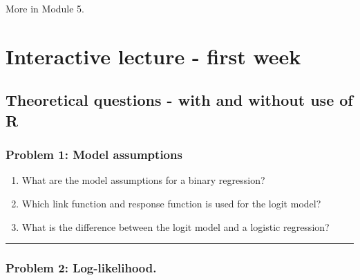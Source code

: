 \documentclass[
]{article}
\providecommand{\tightlist}{%
  \setlength{\itemsep}{0pt}\setlength{\parskip}{0pt}}
\begin{document}
More in Module 5.

\hypertarget{interactive-lecture---first-week}{%
\section{Interactive lecture - first
week}\label{interactive-lecture---first-week}}

\hypertarget{theoretical-questions---with-and-without-use-of-r}{%
\subsection{Theoretical questions - with and without use of
R}\label{theoretical-questions---with-and-without-use-of-r}}

\hypertarget{problem-1-model-assumptions}{%
\subsubsection{Problem 1: Model
assumptions}\label{problem-1-model-assumptions}}

\begin{enumerate}
\def\labelenumi{\alph{enumi})}
\tightlist
\item
  What are the model assumptions for a binary regression?
\item
  Which link function and response function is used for the logit model?
\item
  What is the difference between the logit model and a logistic
  regression?
\end{enumerate}

\begin{center}\rule{0.5\linewidth}{0.5pt}\end{center}

\hypertarget{problem-2-log-likelihood.}{%
\subsubsection{Problem 2:
Log-likelihood.}\label{problem-2-log-likelihood.}}
\end{document}
